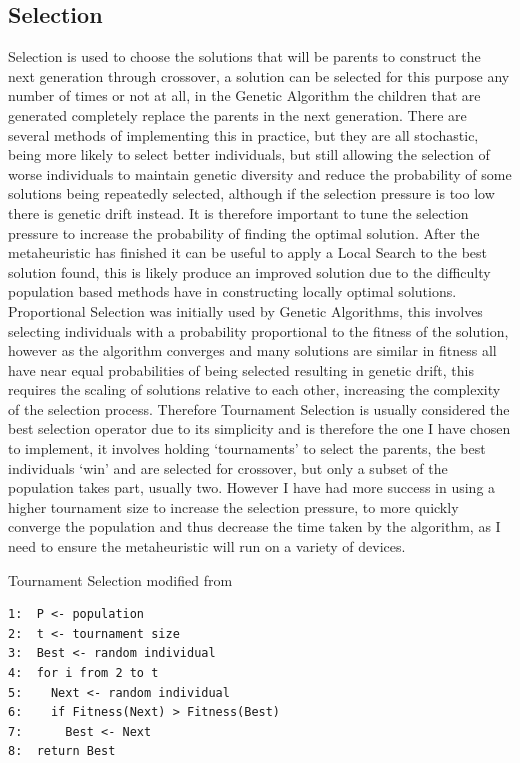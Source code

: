 \documentclass[]{final_report}
\begin{document}
\newpage
\subsection*{Selection}

Selection is used to choose the solutions that will be parents to construct the next generation through crossover, a solution can be selected for this purpose any number of times or not at all, in the Genetic Algorithm the children that are generated completely replace the parents in the next generation. There are several methods of implementing this in practice, but they are all stochastic, being more likely to select better individuals, but still allowing the selection of worse individuals to maintain genetic diversity and reduce the probability of some solutions being repeatedly selected, although if the selection pressure is too low there is genetic drift instead\cite{siarry:2016}. It is therefore important to tune the selection pressure to increase the probability of finding the optimal solution. After the metaheuristic has finished it can be useful to apply a Local Search to the best solution found, this is likely produce an improved solution due to the difficulty population based methods have in constructing locally optimal solutions. Proportional Selection was initially used by Genetic Algorithms, this involves selecting individuals with a probability proportional to the fitness of the solution, however as the algorithm converges and many solutions are similar in fitness all have near equal probabilities of being selected resulting in genetic drift, this requires the scaling of solutions relative to each other, increasing the complexity of the selection process. Therefore Tournament Selection is usually considered the best selection operator due to its simplicity and is therefore the one I have chosen to implement, it involves holding `tournaments' to select the parents, the best individuals `win' and are selected for crossover, but only a subset of the population takes part, usually two\cite{luke:2013}. However I have had more success in using a higher tournament size to increase the selection pressure, to more quickly converge the population and thus decrease the time taken by the algorithm, as I need to ensure the metaheuristic will run on a variety of devices.

Tournament Selection modified from \cite{luke:2013}

\begin{verbatim}
1:  P <- population
2:  t <- tournament size
3:  Best <- random individual
4:  for i from 2 to t
5:    Next <- random individual
6:    if Fitness(Next) > Fitness(Best)
7:      Best <- Next
8:  return Best
\end{verbatim}
\end{document}

